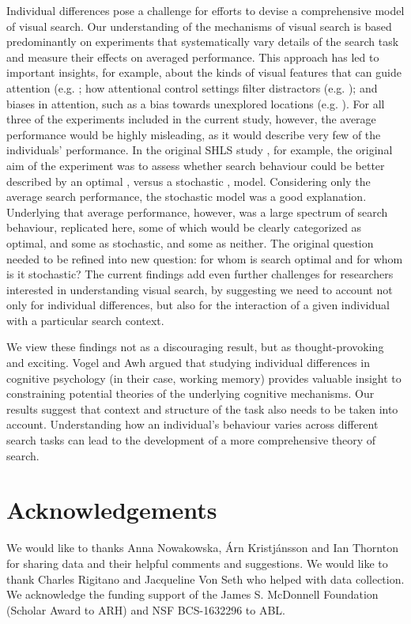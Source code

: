 \documentclass[a4paper, man, natbib, floatsintext]{apa6}
\begin{document}
Individual differences pose a challenge for efforts to devise a comprehensive model of visual search. Our understanding of the mechanisms of visual search is based predominantly on experiments that systematically vary details of the search task and measure their effects on averaged performance. This approach has led to important insights, for example, about the kinds of visual features that can guide attention (e.g.  \citep{treisman1980, wolfe2007}; how attentional control settings filter  distractors (e.g.  \citep{folk1992,yantis1999}); and biases in attention, such as a bias towards unexplored locations (e.g.  \citep{klein2000}). For all three of the experiments included in the current study, however, the average performance would be highly misleading, as it would describe very few of the individuals' performance. In the original SHLS study  \citep{nowakowska2017}, for example, the original aim of the experiment was to assess whether search behaviour could be better described by an optimal  \citep{najemnik-geisler2008}, versus a stochastic  \citep{clarke2016}, model. Considering only the average search performance, the stochastic model was a good explanation. Underlying that average performance, however, was a large spectrum of search behaviour, replicated here, some of which would be clearly categorized as optimal, and some as stochastic, and some as neither. The original question needed to be refined into new question: for whom is search optimal and for whom is it stochastic? The current findings add even further challenges for researchers interested in understanding visual search, by suggesting we need to account not only for individual differences, but also for the interaction of a given individual with a particular search context. 

We view these findings not as a discouraging result, but as thought-provoking and exciting. Vogel and Awh \citep{vogel2008} argued that studying individual differences in cognitive psychology (in their case, working memory) provides valuable insight to constraining potential theories of the underlying cognitive mechanisms. Our results suggest that context and structure of the task also needs to be taken into account. Understanding how an individual's behaviour varies across different search tasks can lead to the development of a more comprehensive theory of search. 


\section*{Acknowledgements}

We would like to thanks Anna Nowakowska, {\'A}rn Kristj{\'a}nsson and Ian Thornton for sharing data and their helpful comments and suggestions. We would like to thank Charles Rigitano and Jacqueline Von Seth who helped with data collection. We acknowledge the funding support of the James S. McDonnell Foundation (Scholar Award to ARH) and NSF BCS-1632296 to ABL.



\end{document}
